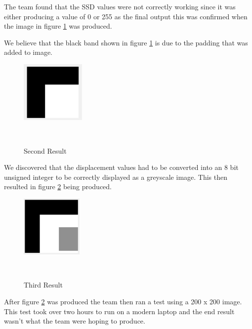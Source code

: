 \documentclass[twocolumn]{article}
\begin{document}
The team found that the SSD values were not correctly working since it was either producing a value of 0 or 255 as the final output this was confirmed when the image in figure \ref{fig:SecondResult} was produced. 

We believe that the black band shown in figure \ref{fig:SecondResult} is due to the padding that was added to image. 

 \begin{figure}[H]
\centering
  \includegraphics[height=30mm]{Figures/Second_Result}
    \caption{Second Result}~\label{fig:SecondResult}
\end{figure} 

We discovered that the displacement values had to be converted into an 8 bit unsigned integer to be correctly displayed as a greyscale image. This then resulted in figure \ref{fig:Third_Result} being produced. 

\begin{figure}[H]
\centering
  \includegraphics[height=30mm]{Figures/Third_Result}
    \caption{Third Result}~\label{fig:Third_Result}
\end{figure} 

After figure \ref{fig:Third_Result} was produced the team then ran a test using a 200 x 200 image. This test took over two hours to run on a modern laptop and the end result wasn't what the team were hoping to produce. 
\end{document}
